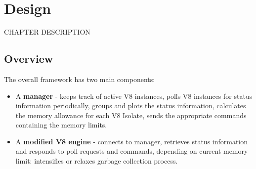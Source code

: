 \documentclass{l4proj}
\begin{document}
\chapter{Design}
CHAPTER DESCRIPTION
\section{Overview}

The overall framework has two main components:
\begin{itemize}
\item A \textbf{manager} - keeps track of active V8 instances, polls V8 instances for status information periodically, groups and plots the status information, calculates the memory allowance for each V8 Isolate, sends the appropriate commands containing the memory limits.
\item A \textbf{modified V8 engine} - connects to manager, retrieves status information and responds to poll requests and commands, depending on current memory limit: intensifies or relaxes garbage collection process.
\end{itemize}
\end{document}
